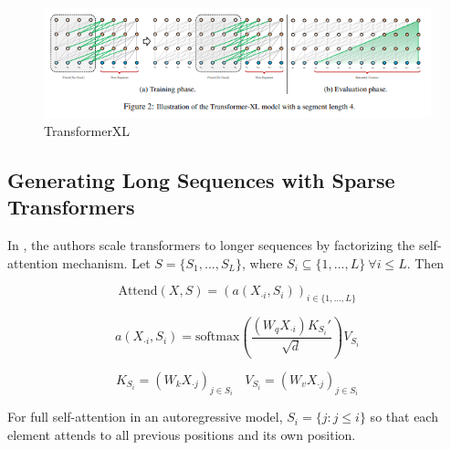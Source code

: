 \documentclass[11pt]{article}
\theoremstyle{definition}
\begin{document}
\begin{figure}
\centering
  \includegraphics[width=\textwidth,height=\textheight,keepaspectratio]{transformers/transformerXL_model.png}
  \caption{TransformerXL \cite{dai2019transformerxl}}
  \label{fig:transformerxl}
\end{figure}


\subsection{Generating Long Sequences with Sparse Transformers}

In \cite{child2019generating}, the authors scale transformers to longer sequences by factorizing the self-attention mechanism. Let $S = \{S_1,...,S_L \}$, where $S_i \subseteq \{1,...,L \} \ \forall i \leq L$. Then

\begin{equation}
\mathrm{Attend}(X,S) = \left( a(X_{\cdot i}, S_i) \right)_{i \in \{1,...,L\}}
\end{equation}

\begin{equation}
a(X_{\cdot i}, S_i) = \mathrm{softmax}\left( \frac{(W_qX_{\cdot i})K_{S_i}'}{\sqrt{d}} \right) V_{S_i}
\end{equation}

\begin{equation}
K_{S_i} = \left( W_k X_{\cdot j} \right)_{j \in S_i} \ \ \ \ V_{S_i} = \left( W_v X_{\cdot j} \right)_{j \in S_i}
\end{equation}

For full self-attention in an autoregressive model, $S_i = \{ j : j \leq i \}$ so that each element attends to all previous positions and its own position.
\end{document}
